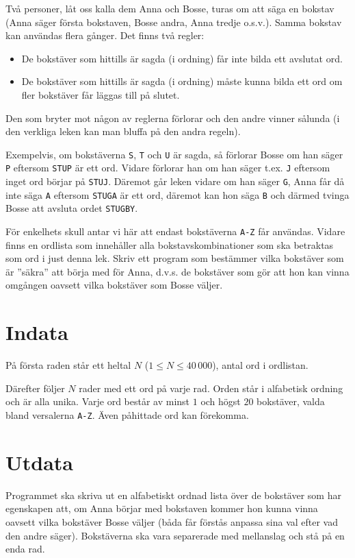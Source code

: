 Två personer, låt oss kalla dem Anna och Bosse, turas om att säga en bokstav (Anna säger första bokstaven, Bosse andra, Anna tredje o.s.v.). Samma bokstav kan användas flera gånger. Det finns två regler:

\begin{itemize}
	\item De bokstäver som hittills är sagda (i ordning) får inte bilda ett avslutat ord.
	\item De bokstäver som hittills är sagda (i ordning) måste kunna bilda ett ord om fler bokstäver får läggas till på slutet.
\end{itemize}

Den som bryter mot någon av reglerna förlorar och den andre vinner sålunda (i den verkliga leken kan man bluffa på den andra regeln).

Exempelvis, om bokstäverna \texttt{S}, \texttt{T} och \texttt{U} är sagda, så förlorar Bosse om han säger \texttt{P} eftersom \texttt{STUP} är ett ord. Vidare förlorar han om han säger t.ex. \texttt{J} eftersom inget ord börjar på \texttt{STUJ}. Däremot går leken vidare om han säger \texttt{G}, Anna får då inte säga \texttt{A} eftersom \texttt{STUGA} är ett ord, däremot kan hon säga \texttt{B} och därmed tvinga Bosse att avsluta ordet \texttt{STUGBY}.

För enkelhets skull antar vi här att endast bokstäverna \texttt{A-Z} får användas. Vidare finns en ordlista som innehåller alla bokstavskombinationer som ska betraktas som ord i just denna lek. Skriv ett program som bestämmer vilka bokstäver som är ''säkra'' att börja med för Anna, d.v.s. de bokstäver som gör att hon kan vinna omgången oavsett vilka bokstäver som Bosse väljer.

\section*{Indata}
På första raden står ett heltal $N$ ($1 \leq N \leq 40\,000$), antal ord i ordlistan.

Därefter följer $N$ rader med ett ord på varje rad.
Orden står i alfabetisk ordning och är alla unika.
Varje ord består av minst $1$ och högst $20$ bokstäver, valda bland versalerna \texttt{A-Z}.
Även påhittade ord kan förekomma.

\section*{Utdata}
Programmet ska skriva ut en alfabetiskt ordnad lista över de bokstäver som har egenskapen att, om Anna börjar med bokstaven kommer hon kunna vinna oavsett vilka bokstäver Bosse väljer (båda får förstås anpassa sina val efter vad den andre säger). Bokstäverna ska vara separerade med mellanslag och stå på en enda rad.

